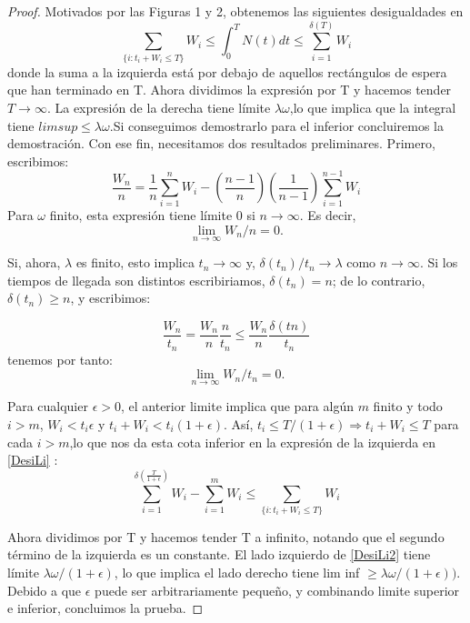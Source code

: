 \documentclass[a4paper,10pt]{scrartcl}
\theoremstyle{definition}
\numberwithin{equation}{section}
\begin{document}
\begin{proof}
Motivados por las Figuras 1 y 2, obtenemos las siguientes desigualdades en
\begin{equation}
 \sum_{\{i:t_i+W_i\leq T\}}^{} W_i\leq\int_{0}^{T}N(t)dt\leq \sum_{i=1}^{\delta(T)} W_i
 \label{DesiLi}
 \end{equation}
donde la suma a la izquierda está por debajo de aquellos rectángulos de espera que han terminado en T.
Ahora dividimos la expresión por T y hacemos tender $T\rightarrow\infty$. La expresión de la derecha tiene límite $\lambda\omega$,lo que implica que la integral tiene $lim sup \leq \lambda\omega$.Si conseguimos demostrarlo para el inferior concluiremos la demostración. Con ese fin, necesitamos dos resultados preliminares. Primero, escribimos:
\[ \frac{W_n}{n}=\frac{1}{n}\sum_{i=1}^{n}W_i-(\frac{n-1}{n})(\frac{1}{n-1})\sum_{i=1}^{n-1}W_i \]
Para $\omega$ finito, esta expresión tiene límite 0 si $n \rightarrow \infty$. Es decir,
\[ \lim_{n\to\infty} W_n / n = 0. \]

Si, ahora, $\lambda$ es finito, esto implica $t_n \rightarrow \infty$ y, $\delta(t_n)/t_n \rightarrow  \lambda$ como $n \rightarrow \infty$. Si los tiempos de llegada son distintos escribiriamos, $\delta(t_n)=n$; de lo contrario, $\delta(t_n)\geq n$, y escribimos:

\[ \frac{W_n }{t_n} = \frac{W_n }{n}\frac{n }{t_n}\leq \frac{W_n }{n}\frac{\delta(tn)}{t_n} \]
 tenemos por tanto:
 \[ \lim_{n\to\infty} W_n / t_n = 0. \]

Para cualquier $\epsilon> 0$, el anterior limite implica que para algún $m$ finito y todo $i> m$, $W_i <t_i\epsilon$ y $t_i + W_i <t_i (1 + \epsilon)$. Así, $t_i \leq T / (1 + \epsilon) \Longrightarrow t_i + W_i \leq T$ para cada $i> m$,lo que nos da esta cota inferior en la expresión de la izquierda en \ref{DesiLi} :
\begin{equation}\sum_{i=1}^{\delta(\frac{T}{1+\epsilon})} W_i-\sum_{i=1}^{m} W_i\leq \sum_{\{i:t_i+W_i\leq T\}}^{} W_i
\label{DesiLi2}
\end{equation}

Ahora dividimos por T y hacemos tender T a infinito, notando que el segundo término de la izquierda es un
constante. El lado izquierdo de \ref{DesiLi2} tiene límite $ \lambda\omega / (1 + \epsilon)$, lo que implica el lado derecho tiene lim inf $\geq \lambda\omega / (1 + \epsilon))$. Debido a que $\epsilon$ puede ser arbitrariamente pequeño, y combinando limite superior e inferior, concluimos la prueba.
\end{proof}
  
\end{document}
